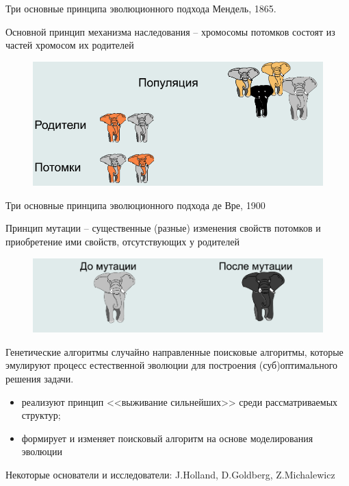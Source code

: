 \documentclass{beamer}
\begin{document}
\begin{frame}{Три основные принципа эволюционного подхода}
Мендель, 1865. 

Основной принцип механизма наследования – хромосомы потомков состоят из частей хромосом их родителей
\begin{figure}[h]
\centering
\includegraphics[scale=0.4]{images/lec04-pic02.png}
\end{figure}
\end{frame}

\begin{frame}{Три основные принципа эволюционного подхода}
де Вре, 1900

Принцип мутации – существенные (разные) изменения свойств потомков и приобретение ими свойств, отсутствующих у родителей
\begin{figure}[h]
\centering
\includegraphics[scale=0.4]{images/lec04-pic03.png}
\end{figure}
\end{frame}

\begin{frame}
\begin{block}{Генетические алгоритмы}
случайно направленные поисковые алгоритмы, которые эмулируют процесс естественной
эволюции для построения (суб)оптимального решения задачи.
\end{block}
\begin{itemize}
\item реализуют принцип <<выживание сильнейших>> среди рассматриваемых
структур;
\item формирует и изменяет поисковый алгоритм на основе моделирования эволюции
\end{itemize}
Некоторые основатели и исследователи: J.Holland, D.Goldberg, Z.Michalewicz 
\end{frame}
\end{document}
